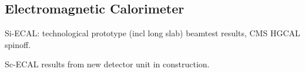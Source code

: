 \subsection{Electromagnetic Calorimeter}

Si-ECAL: technological prototype (incl long slab) beamtest results, CMS HGCAL spinoff.

Sc-ECAL results from new detector unit in construction.

\vspace{2cm}